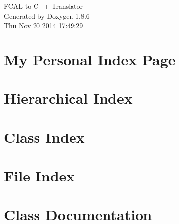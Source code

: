 \documentclass[twoside]{book}
\newcommand{\clearemptydoublepage}{%
  \newpage{\pagestyle{empty}\cleardoublepage}%
}
\begin{document}
\hypersetup{pageanchor=false}
\begin{titlepage}
\vspace*{7cm}
\begin{center}%
{\Large F\-C\-A\-L to C++ Translator }\\
\vspace*{1cm}
{\large Generated by Doxygen 1.8.6}\\
\vspace*{0.5cm}
{\small Thu Nov 20 2014 17:49:29}\\
\end{center}
\end{titlepage}
\clearemptydoublepage
\tableofcontents
\clearemptydoublepage
{}
\hypersetup{pageanchor=true}

\chapter{My Personal Index Page}
\label{index}\hypertarget{index}{}
\chapter{Hierarchical Index}

\chapter{Class Index}

\chapter{File Index}

\chapter{Class Documentation}





















































\end{document}
